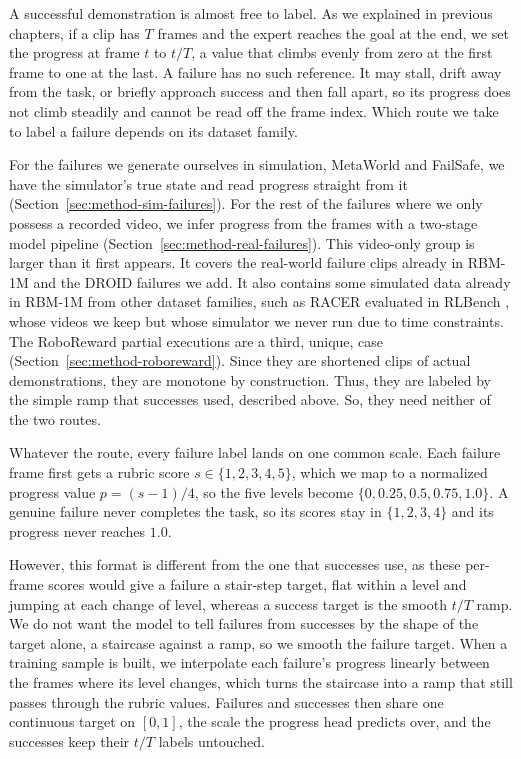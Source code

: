 A successful demonstration is almost free to label. As we explained in previous chapters, if a clip has $T$ frames and the expert reaches the goal at the end, we set the progress at frame $t$ to $t/T$, a value that climbs evenly from zero at the first frame to one at the last. A failure has no such reference. It may stall, drift away from the task, or briefly approach success and then fall apart, so its progress does not climb steadily and cannot be read off the frame index. Which route we take to label a failure depends on its dataset family. 

For the failures we generate ourselves in simulation, MetaWorld and FailSafe, we have the simulator's true state and read progress straight from it (Section~\ref{sec:method-sim-failures}). For the rest of the failures where we only possess a recorded video, we infer progress from the frames with a two-stage model pipeline (Section~\ref{sec:method-real-failures}). This video-only group is larger than it first appears. It covers the real-world failure clips already in RBM-1M and the DROID failures we add. It also contains some simulated data already in RBM-1M from other dataset families, such as RACER \citep{dai_racer_2025} evaluated in RLBench \citep{james_rlbench_2020}, whose videos we keep but whose simulator we never run due to time constraints. The RoboReward partial executions are a third, unique, case (Section~\ref{sec:method-roboreward}). Since they are shortened clips of actual demonstrations, they are monotone by construction. Thus, they are labeled by the simple ramp that successes used, described above. So, they need neither of the two routes.

Whatever the route, every failure label lands on one common scale. Each failure frame first gets a rubric score $s \in \{1,2,3,4,5\}$, which we map to a normalized progress value $p = (s-1)/4$, so the five levels become $\{0, 0.25, 0.5, 0.75, 1.0\}$. A genuine failure never completes the task, so its scores stay in $\{1,2,3,4\}$ and its progress never reaches $1.0$.

However, this format is different from the one that successes use, as these per-frame scores would give a failure a stair-step target, flat within a level and jumping at each change of level, whereas a success target is the smooth $t/T$ ramp. We do not want the model to tell failures from successes by the shape of the target alone, a staircase against a ramp, so we smooth the failure target. When a training sample is built, we interpolate each failure's progress linearly between the frames where its level changes, which turns the staircase into a ramp that still passes through the rubric values. Failures and successes then share one continuous target on $[0,1]$, the scale the progress head predicts over, and the successes keep their $t/T$ labels untouched. 

